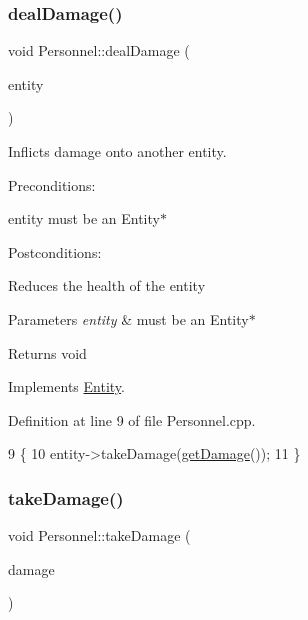 \subsubsection{\texorpdfstring{deal\+Damage()}{dealDamage()}}
{\footnotesize\ttfamily void Personnel\+::deal\+Damage (\begin{DoxyParamCaption}\item[{\hyperlink{classEntity}{Entity} $\ast$}]{entity }\end{DoxyParamCaption})\hspace{0.3cm}{\ttfamily [virtual]}}



Inflicts damage onto another entity. 

Preconditions\+:
\begin{DoxyItemize}
\item entity must be an Entity$\ast$
\end{DoxyItemize}

Postconditions\+:
\begin{DoxyItemize}
\item Reduces the health of the entity
\end{DoxyItemize}


\begin{DoxyParams}{Parameters}
{\em entity} & must be an Entity$\ast$ \\
\hline
\end{DoxyParams}
\begin{DoxyReturn}{Returns}
void 
\end{DoxyReturn}


Implements \hyperlink{classEntity}{Entity}.



Definition at line 9 of file Personnel.\+cpp.


\begin{DoxyCode}
9                                          \{
10     entity->takeDamage(\hyperlink{classEntity_ad38d4384aa0adef43443666a33f06508}{getDamage}());
11 \}
\end{DoxyCode}
\mbox{\label{classPersonnel_aeb670c84c0168f872346c55f7fc8383f}} 
\subsubsection{\texorpdfstring{take\+Damage()}{takeDamage()}}
{\footnotesize\ttfamily void Personnel\+::take\+Damage (\begin{DoxyParamCaption}\item[{int}]{damage }\end{DoxyParamCaption})\hspace{0.3cm}{\ttfamily [virtual]}}



